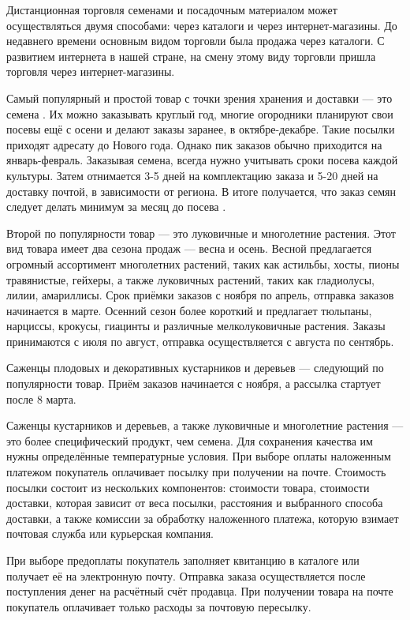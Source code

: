 Дистанционная торговля семенами и посадочным материалом может осуществляться двумя способами: через каталоги и через интернет-магазины. До недавнего времени основным видом торговли была продажа через каталоги. С развитием интернета в нашей стране, на смену этому виду торговли пришла торговля через интернет-магазины.

Самый популярный и простой товар с точки зрения хранения и доставки — это семена \cite{krivko}. Их можно заказывать круглый год, многие огородники планируют свои посевы ещё с осени и делают заказы заранее, в октябре-декабре. Такие посылки приходят адресату до Нового года. Однако пик заказов обычно приходится на январь-февраль. Заказывая семена, всегда нужно учитывать сроки посева каждой культуры. Затем отнимается 3-5 дней на комплектацию заказа и 5-20 дней на доставку почтой, в зависимости от региона. В итоге получается, что заказ семян следует делать минимум за месяц до посева \cite{kaygorodtseva}.

Второй по популярности товар — это луковичные и многолетние растения. Этот вид товара имеет два сезона продаж — весна и осень. Весной предлагается огромный ассортимент многолетних растений, таких как астильбы, хосты, пионы травянистые, гейхеры, а также луковичных растений, таких как гладиолусы, лилии, амариллисы. Срок приёмки заказов с ноября по апрель, отправка заказов начинается в марте. Осенний сезон более короткий и предлагает тюльпаны, нарциссы, крокусы, гиацинты и различные мелколуковичные растения. Заказы принимаются с июля по август, отправка осуществляется с августа по сентябрь.

Саженцы плодовых и декоративных кустарников и деревьев — следующий по популярности товар. Приём заказов начинается с ноября, а рассылка стартует после 8 марта.

Саженцы кустарников и деревьев, а также луковичные и многолетние растения — это более специфический продукт, чем семена. Для сохранения качества им нужны определённые температурные условия.
При выборе оплаты наложенным платежом покупатель оплачивает посылку при получении на почте. Стоимость посылки состоит из нескольких компонентов: стоимости товара, стоимости доставки, которая зависит от веса посылки, расстояния и выбранного способа доставки, а также комиссии за обработку наложенного платежа, которую взимает почтовая служба или курьерская компания.

При выборе предоплаты покупатель заполняет квитанцию в каталоге или получает её на электронную почту. Отправка заказа осуществляется после поступления денег на расчётный счёт продавца. При получении товара на почте покупатель оплачивает только расходы за почтовую пересылку.


